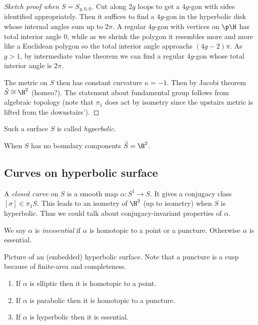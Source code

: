 \documentclass[a4paper]{article}
\renewcommand{\b}{\p}
\begin{document}
\begin{proof}[Sketch proof when \(S = S_{g, 0, 0}\)]
  Cut along \(2g\) loops to get a \(4g\)-gon with sides identified appropriately. Then it suffices to find a \(4g\)-gon in the hyperbolic disk whose internal angles sum up to \(2\pi\). A regular \(4g\)-gon with vertices on \(\b \H\) has total interior angle \(0\), while as we shrink the polygon it resembles more and more like a Euclidean polygon so the total interior angle approachs \((4g - 2)\pi\). As \(g > 1\), by intermediate value theorem we can find a regular \(4g\)-gon whose total interior angle is \(2\pi\).

  The metric on \(S\) then has constant curvature \(\kappa = -1\). Then by Jacobi theorem \(\tilde S \cong \H^2\) (homeo?). The statement about fundamental group follows from algebraic topology (note that \(\pi_1\) does act by isometry since the upstairs metric is lifted from the downstairs').
\end{proof}

Such a surface \(S\) is called \emph{hyperbolic}.

\begin{remark}
  When \(S\) has no boundary components \(\tilde S = \H^2\).
\end{remark}

\subsection{Curves on hyperbolic surface}

A \emph{closed curve} on \(S\) is a smooth map \(\alpha: S^1 \to S\). It gives a conjugacy class \([\sigma] \in \pi_1S\). This leads to an isometry of \(\H^2\) (up to isometry) when \(S\) is hyperbolic. Thus we could talk about conjugacy-invariant properties of \(\alpha\).

\begin{definition}
  We say \(\alpha\) is \emph{inessential} if \(\alpha\) is homotopic to a point or a puncture. Otherwise \(\alpha\) is essential.
\end{definition}

Picture of an (embedded) hyperbolic surface. Note that a puncture is a cusp because of finite-area and completeness.

\begin{lemma}\leavevmode
  \begin{enumerate}
  \item If \(\alpha\) is elliptic then it is homotopic to a point.
  \item If \(\alpha\) is parabolic then it is homotopic to a puncture.
  \item If \(\alpha\) is hyperbolic then it is essential.
  \end{enumerate}
\end{lemma}
\end{document}
